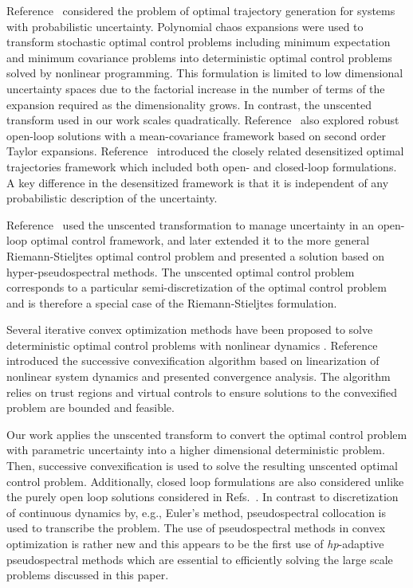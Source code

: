 \documentclass[10pt,a4paper]{article}
\begin{document}
	Reference~\cite{PCE_OCP_Bhattacharya} considered the problem of optimal trajectory generation for systems with probabilistic uncertainty. Polynomial chaos expansions were used to transform stochastic optimal control problems including minimum expectation and minimum covariance problems into deterministic optimal control problems solved by nonlinear programming. This formulation is limited to low dimensional uncertainty spaces due to the factorial increase in the number of terms of the expansion required as the dimensionality grows. In contrast, the unscented transform used in our work scales quadratically. Reference~\cite{OpenLoopUncertain} also explored robust open-loop solutions with a mean-covariance framework based on second order Taylor expansions. Reference~\cite{Desensitized} introduced the closely related desensitized optimal trajectories framework which included both open- and closed-loop formulations. A key difference in the desensitized framework is that it is independent of any probabilistic description of the uncertainty. %
	
	Reference~\cite{UnscentedOptimalControl} used the unscented transformation to manage uncertainty in an open-loop optimal control framework, and later extended it to the more general Riemann-Stieljtes optimal control problem \cite{RSOptimalControl} and presented a solution based on hyper-pseudospectral methods. The unscented optimal control problem corresponds to a particular semi-discretization of the optimal control problem and is therefore a special case of the Riemann-Stieljtes formulation. 
			
	Several iterative convex optimization methods have been proposed to solve deterministic optimal control problems with nonlinear dynamics \cite{SeqConProg,SuccConvex1}.	Reference~\cite{SuccConvex1} introduced the successive convexification algorithm based on linearization of nonlinear system dynamics and presented convergence analysis. The algorithm relies on trust regions and virtual controls to ensure solutions to the convexified problem are bounded and feasible. 		
	
	Our work applies the unscented transform to convert the optimal control problem with parametric uncertainty into a higher dimensional deterministic problem. Then, successive convexification is used to solve the resulting unscented optimal control problem. Additionally, closed loop formulations are also considered unlike the purely open loop solutions considered in Refs.~\cite{PCE_OCP_Bhattacharya,OpenLoopUncertain,UnscentedOptimalControl,RSOptimalControl}. In contrast to discretization of continuous dynamics by, e.g., Euler's method, pseudospectral collocation is used to transcribe the problem. The use of pseudospectral methods in convex optimization is rather new \cite{PS_Convex,PS_Convex_ascent} and this appears to be the first use of \textit{hp}-adaptive pseudospectral methods \cite{hp_adapt} which are essential to efficiently solving the large scale problems discussed in this paper. %
		
\end{document}

